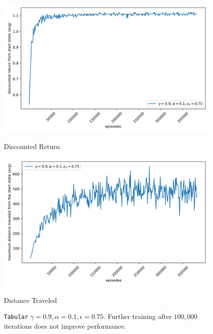 \begin{figure}[H]
    \centering
    \begin{minipage}{0.49\linewidth}
        \centering
        \includegraphics[width=\linewidth]{plots/part3-tabular-bad-rewards.png}
        \caption{Discounted Return}
    \end{minipage}
    \hfill
    \begin{minipage}{0.49\linewidth}
        \centering
        \includegraphics[width=\linewidth]{plots/part3-tabular-bad-distances.png}
        \caption{Distance Traveled}
    \end{minipage}
    \caption{\texttt{Tabular} $\gamma = 0.9, \alpha = 0.1, \epsilon = 0.75$. Further training after $100,000$ iterations does not improve performance.}
    \label{fig:part3-tabular}
\end{figure}

